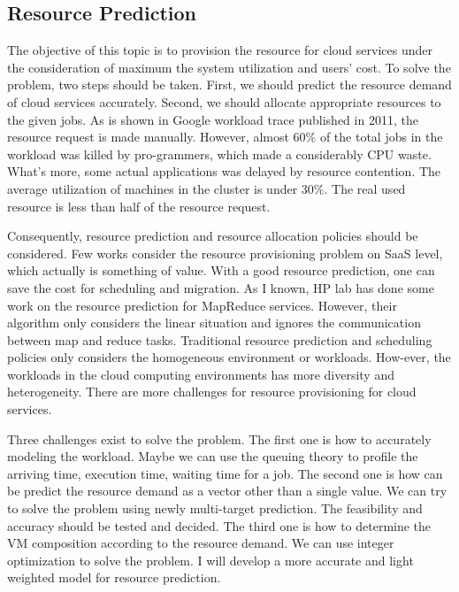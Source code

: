 \subsection{Resource Prediction}

The objective of this topic is to provision the resource for cloud services under the consideration of maximum the system utilization and users' cost. To solve the problem, two steps should be taken. First, we should predict the resource demand of cloud services accurately. Second, we should allocate appropriate resources to the given jobs. As is shown in Google workload trace published in 2011, the resource request is made manually. However, almost 60\% of the total jobs in the workload was killed by pro-grammers, which made a considerably CPU waste. What's more, some actual applications was delayed by resource contention. The average utilization of machines in the cluster is under 30\%. The real used resource is less than half of the resource request.

Consequently, resource prediction and resource allocation policies should be considered. Few works consider the resource provisioning problem on SaaS level, which actually is something of value. With a good resource prediction, one can save the cost for scheduling and migration. As I known, HP lab has done some work on the resource prediction for MapReduce services. However, their algorithm only considers the linear situation and ignores the communication between map and reduce tasks. Traditional resource prediction and scheduling policies only considers the homogeneous environment or workloads. How-ever, the workloads in the cloud computing environments has more diversity and heterogeneity. There are more challenges for resource provisioning for cloud services.

Three challenges exist to solve the problem. The first one is how to accurately modeling the workload. Maybe we can use the queuing theory to profile the arriving time, execution time, waiting time for a job.  The second one is how can be predict the resource demand as a vector other than a single value. We can try to solve the problem using newly multi-target prediction. The feasibility and accuracy should be tested and decided. The third one is how to determine the VM composition according to the resource demand. We can use integer optimization to solve the problem. I will develop a more accurate and light weighted model for resource prediction.
